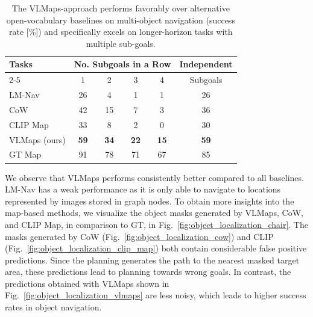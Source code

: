 \documentclass[letterpaper, 10 pt, conference]{ieeeconf}  %
\begin{document}
\begin{table}[h]
  \setlength\tabcolsep{5.2pt}
  \centering
  \begin{tabular}{lccccc}
  \toprule
\multirow{2}[1]{*}{Tasks}  & \multicolumn{4}{l}{No. Subgoals in a Row} & Independent      \\                
                    \cmidrule(lr){2-5}
        &   1             & 2           & 3           & 4    &  Subgoals\\
\midrule
LM-Nav \cite{shah2022lm}& 26                  & 4               & 1               & 1               & 26         \\
CoW \cite{gadre2022clip}& 42                  & 15               & 7               & 3               & 36         \\
CLIP Map        & 33                  & 8                & 2               & 0               & 30         \\
VLMaps (ours) & \textbf{59}         & \textbf{34}      & \textbf{22}     & \textbf{15}     & \textbf{59}     \\
\midrule
GT Map    & 91         & 78      & 71     & 67     & 85          \\
  \bottomrule
  \end{tabular}
  \caption{The VLMaps-approach performs favorably over alternative open-vocabulary baselines on multi-object navigation (success rate [\%]) and specifically excels on longer-horizon tasks with multiple sub-goals.}
  \label{table:multi_obj_nav}
  \vspace{-1em}
\end{table}

We observe that VLMaps performs consistently better compared to all baselines. LM-Nav has a weak performance as it is only able to navigate to locations represented by images stored in graph nodes. To obtain more insights into the map-based methods, we visualize the object masks generated by VLMaps, CoW, and CLIP Map, in comparison to GT, in Fig.~\ref{fig:object_localization_chair}. The masks generated by CoW (Fig.~\ref{fig:object_localization_cow}) and CLIP (Fig.~\ref{fig:object_localization_clip_map}) both contain considerable false positive predictions. Since the planning generates the path to the nearest masked target area, these predictions lead to planning towards wrong goals. In contrast, the predictions obtained with VLMaps shown in Fig.~\ref{fig:object_localization_vlmaps} are less noisy, which leads to higher success rates in object navigation.
\end{document}
